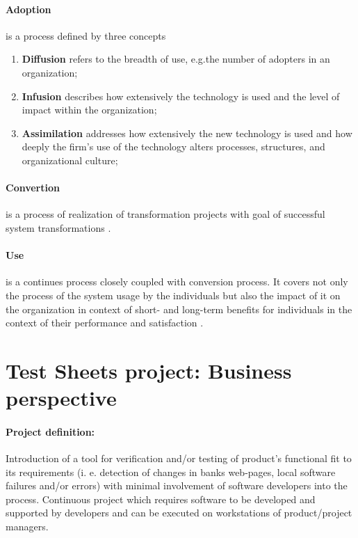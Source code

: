 \paragraph{Adoption} is a process defined by three concepts\cite{MES7}
\begin{enumerate}
	\item \textbf{Diffusion} refers to the breadth of use, e.g.the number of adopters in an organization;
	\item \textbf{Infusion} describes how extensively the technology is used and the level of impact within the organization;
	\item \textbf{Assimilation} addresses how extensively the new technology is used and how deeply the firm's use of the technology alters processes, structures, and organizational culture;
\end{enumerate}

\paragraph{Convertion} is a process of realization of transformation projects with goal of successful system transformations \cite{MES9}.

\paragraph{Use} is a continues process closely coupled with conversion process. It covers not only the process of the system usage by the individuals but also the impact of it on the organization in context of short- and long-term benefits for individuals in the context of their performance and satisfaction \cite{MES9}.

\section{Test Sheets project: Business perspective}




\paragraph{Project definition:} Introduction of a tool for verification and/or testing of product’s functional fit to its requirements (i. e. detection of changes in banks web-pages, local software failures and/or errors) with minimal involvement of software developers into the process. Continuous project which requires software to be developed and supported by developers and can be executed on workstations of product/project managers.

